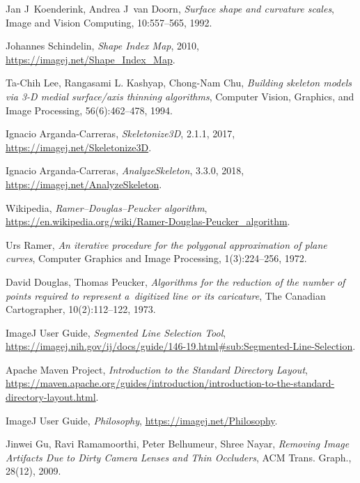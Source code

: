 \documentclass[declaration,shortabstract,mgr]{iithesis}
\begin{document}
\begin{thebibliography}{1}
  Jan J~Koenderink, Andrea J~van Doorn,
  \emph{Surface shape and curvature scales},
  Image and Vision Computing,
  10:557--565,
  1992.

  Johannes Schindelin,
  \emph{Shape Index Map},
  2010,
  \url{https://imagej.net/Shape_Index_Map}.

  Ta-Chih Lee, Rangasami L. Kashyap, Chong-Nam Chu,
  \emph{Building skeleton models via 3-D medial surface/axis thinning algorithms},
  Computer Vision, Graphics, and Image Processing,
  56(6):462--478,
  1994.

  Ignacio Arganda-Carreras,
  \emph{Skeletonize3D},
  2.1.1,
  2017,
  \url{https://imagej.net/Skeletonize3D}.

  Ignacio Arganda-Carreras,
  \emph{AnalyzeSkeleton},
  3.3.0,
  2018,
  \url{https://imagej.net/AnalyzeSkeleton}.

  Wikipedia,
  \emph{Ramer--Douglas--Peucker algorithm},
  \url{https://en.wikipedia.org/wiki/Ramer-Douglas-Peucker_algorithm}.

  Urs Ramer,
  \emph{An iterative procedure for the polygonal approximation of plane curves},
  Computer Graphics and Image Processing,
  1(3):224–256,
  1972.

  David Douglas, Thomas Peucker,
  \emph{Algorithms for the reduction of the number of points required to represent a~digitized line or its caricature},
  The Canadian Cartographer,
  10(2):112–122,
  1973.

  ImageJ User Guide,
  \emph{Segmented Line Selection Tool},
  \url{https://imagej.nih.gov/ij/docs/guide/146-19.html#sub:Segmented-Line-Selection}.

  Apache Maven Project,
  \emph{Introduction to the Standard Directory Layout},
  \url{https://maven.apache.org/guides/introduction/introduction-to-the-standard-directory-layout.html}.

  ImageJ User Guide,
  \emph{Philosophy},
  \url{https://imagej.net/Philosophy}.

  Jinwei Gu, Ravi Ramamoorthi, Peter Belhumeur, Shree Nayar,
  \emph{Removing Image Artifacts Due to Dirty Camera Lenses and Thin Occluders},
  ACM Trans. Graph.,
  28(12),
  2009.

\end{thebibliography}
\end{document}
